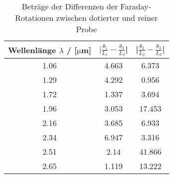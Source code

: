 \begin{table}

  \centering
\begin{tabular}{c|c|c}

  \toprule
Wellenlänge $\lambda$ / [$\si{\micro}$m] & $|\frac{\theta_1}{L_1}-\frac{\theta_3}{L_3}$| & |$\frac{\theta_2}{L_2}-\frac{\theta_3}{L_3}$| \\

\midrule
1.06 & 4.663 & 6.373 \\

1.29 & 4.292 & 0.956 \\

1.72 & 1.337 & 3.694 \\

1.96 & 3.053 & 17.453 \\

2.16 & 3.685 & 6.933 \\

2.34 & 6.947 & 3.316 \\

2.51 & 2.14  & 41.866 \\

2.65 & 1.119 & 13.222 \\
\bottomrule

\end{tabular}
\caption{Beträge der Differenzen der Faraday-Rotationen zwischen dotierter und reiner Probe}

\label{tab:difftab}
\end{table}

